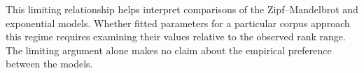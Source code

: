 \documentclass[10pt]{article}
\begin{document}
This limiting relationship helps interpret comparisons of the Zipf--Mandelbrot and exponential models. Whether fitted parameters for a particular corpus approach this regime requires examining their values relative to the observed rank range. The limiting argument alone makes no claim about the empirical preference between the models.
\end{document}
